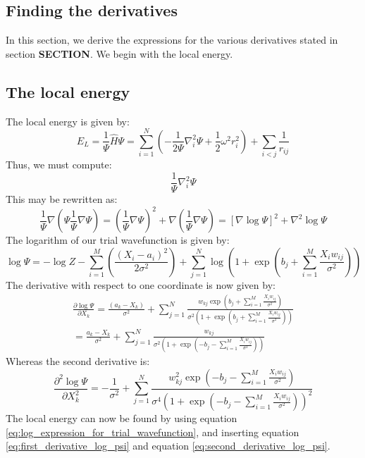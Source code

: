 \documentclass[a4paper, 10pt]{article}
\begin{document}
	\begin{appendices}
	\section{Finding the derivatives}\label{ap:finding_derivatives}
	In this section, we derive the expressions for the various derivatives stated in section \textbf{SECTION}. We begin with the local energy.
	\subsection{The local energy}
	The local energy is given by:
	\begin{equation}
	E_L=\frac{1}{\Psi}\hat{H}\Psi= \sum_{i=1}^N \left(-\frac{1}{2\Psi}\nabla_i^2 \Psi + \frac{1}{2}\omega^2 r_i^2\right)+\sum_{i<j} \frac{1}{r_{ij}}
	\end{equation}
	Thus, we must compute:
	\begin{equation}
	\frac{1}{\Psi}\nabla_i^2 \Psi
	\end{equation}
	This may be rewritten as:
	\begin{equation}\label{eq:log_expression_for_trial_wavefunction}
	\frac{1}{\Psi}\nabla \left(\Psi \frac{1}{\Psi} \nabla\Psi\right)=\left(\frac{1}{\Psi}\nabla \Psi\right)^2+\nabla \left(\frac{1}{\Psi}\nabla \Psi \right)=\left[\nabla \log \Psi\right]^2 + \nabla^2 \log \Psi
	\end{equation}
	The logarithm of our trial wavefunction is given by:
	\begin{equation}\label{eq:logarithm_of_wavefunction}
	\log \Psi = -\log Z -\sum_{i=1}^M \left(\frac{(X_i-a_i)^2}{2\sigma^2}\right)+\sum_{j=1}^N \log \left(1+\exp \left(b_j+\sum_{i=1}^{M} \frac{X_iw_{ij}}{\sigma^2}\right)\right)
	\end{equation}
	The derivative with respect to one coordinate is now given by:
	\begin{equation}\label{eq:first_derivative_log_psi}
	\begin{split}
	\frac{\partial \log \Psi}{\partial X_k}=\frac{(a_k-X_k)}{\sigma^2}+\sum_{j=1}^N \frac{w_{kj} \exp \left(b_j+\sum_{i=1}^{M} \frac{X_iw_{ij}}{\sigma^2}\right)}{\sigma^2 \left(1+\exp \left(b_j+\sum_{i=1}^{M} \frac{X_iw_{ij}}{\sigma^2}\right)\right)}\\
	=\frac{a_k-X_k}{\sigma^2}+\sum_{j=1}^N \frac{w_{kj}}{\sigma^2 \left(1+ \exp \left(-b_j-\sum_{i=1}^{M} \frac{X_iw_{ij}}{\sigma^2}\right)\right)}
	\end{split}
	\end{equation}
	Whereas the second derivative is:
	\begin{equation}\label{eq:second_derivative_log_psi}
	\frac{\partial^2 \log \Psi}{\partial X_k^2}=-\frac{1}{\sigma^2}+\sum_{j=1}^N \frac{w_{kj}^2 \exp \left(-b_j-\sum_{i=1}^{M}\frac{X_iw_{ij}}{\sigma^2} \right)}{\sigma^4\left(1+ \exp \left(-b_j-\sum_{i=1}^{M} \frac{X_iw_{ij}}{\sigma^2}\right)\right)^2}
	\end{equation}
	The local energy can now be found by using equation \ref{eq:log_expression_for_trial_wavefunction}, and inserting equation \ref{eq:first_derivative_log_psi} and equation \ref{eq:second_derivative_log_psi}.

\end{appendices}
\end{document}
